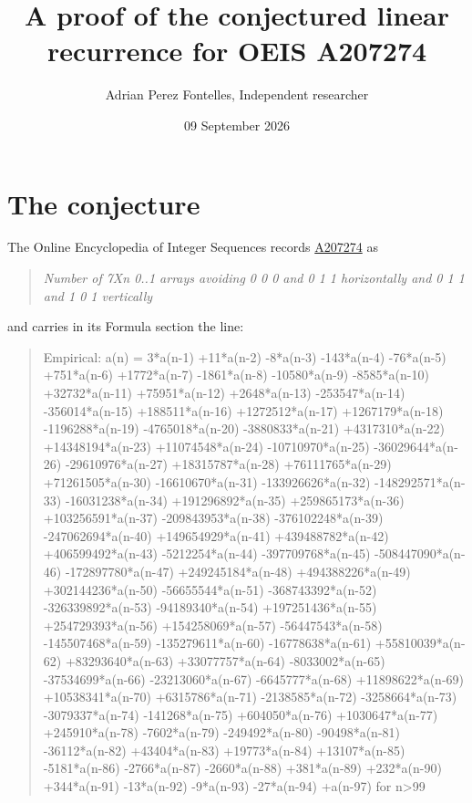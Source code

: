 \documentclass[11pt]{article}
\title{A proof of the conjectured linear recurrence for OEIS A207274}
\author{Adrian Perez Fontelles, Independent researcher}
\date{09 September 2026}
\theoremstyle{definition}
\begin{document}
\maketitle
\section{The conjecture}

The Online Encyclopedia of Integer Sequences records \href{https://oeis.org/A207274}{A207274} as

\begin{quote}\itshape Number of 7Xn 0..1 arrays avoiding 0 0 0 and 0 1 1 horizontally and 0 1 1 and 1 0 1 vertically\end{quote}

and carries in its Formula section the line:

\begin{quote}\ttfamily Empirical: a(n) = 3*a(n-1) +11*a(n-2) -8*a(n-3) -143*a(n-4) -76*a(n-5) +751*a(n-6) +1772*a(n-7) -1861*a(n-8) -10580*a(n-9) -8585*a(n-10) +32732*a(n-11) +75951*a(n-12) +2648*a(n-13) -253547*a(n-14) -356014*a(n-15) +188511*a(n-16) +1272512*a(n-17) +1267179*a(n-18) -1196288*a(n-19) -4765018*a(n-20) -3880833*a(n-21) +4317310*a(n-22) +14348194*a(n-23) +11074548*a(n-24) -10710970*a(n-25) -36029644*a(n-26) -29610976*a(n-27) +18315787*a(n-28) +76111765*a(n-29) +71261505*a(n-30) -16610670*a(n-31) -133926626*a(n-32) -148292571*a(n-33) -16031238*a(n-34) +191296892*a(n-35) +259865173*a(n-36) +103256591*a(n-37) -209843953*a(n-38) -376102248*a(n-39) -247062694*a(n-40) +149654929*a(n-41) +439488782*a(n-42) +406599492*a(n-43) -5212254*a(n-44) -397709768*a(n-45) -508447090*a(n-46) -172897780*a(n-47) +249245184*a(n-48) +494388226*a(n-49) +302144236*a(n-50) -56655544*a(n-51) -368743392*a(n-52) -326339892*a(n-53) -94189340*a(n-54) +197251436*a(n-55) +254729393*a(n-56) +154258069*a(n-57) -56447543*a(n-58) -145507468*a(n-59) -135279611*a(n-60) -16778638*a(n-61) +55810039*a(n-62) +83293640*a(n-63) +33077757*a(n-64) -8033002*a(n-65) -37534699*a(n-66) -23213060*a(n-67) -6645777*a(n-68) +11898622*a(n-69) +10538341*a(n-70) +6315786*a(n-71) -2138585*a(n-72) -3258664*a(n-73) -3079337*a(n-74) -141268*a(n-75) +604050*a(n-76) +1030647*a(n-77) +245910*a(n-78) -7602*a(n-79) -249492*a(n-80) -90498*a(n-81) -36112*a(n-82) +43404*a(n-83) +19773*a(n-84) +13107*a(n-85) -5181*a(n-86) -2766*a(n-87) -2660*a(n-88) +381*a(n-89) +232*a(n-90) +344*a(n-91) -13*a(n-92) -9*a(n-93) -27*a(n-94) +a(n-97) for n>99\end{quote}
\end{document}
